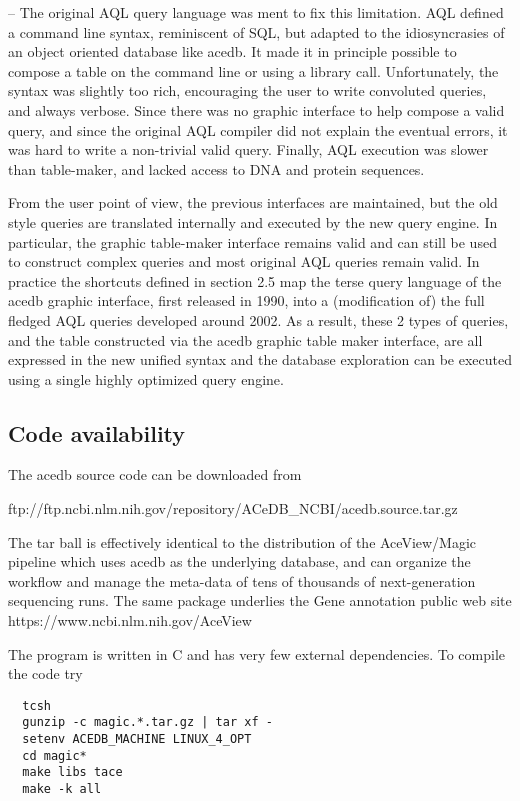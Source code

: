 \documentclass[11pt]{article}
\newcommand{\BL}{\begin{lstlisting}}
\begin{document}
-- The original AQL query language was ment to fix this limitation. AQL defined a command line syntax, reminiscent of SQL, but adapted to the idiosyncrasies of an object oriented database like acedb. It made it in principle possible to compose a table on the command line or using a library call. Unfortunately, the syntax was slightly too rich, encouraging the user to write convoluted queries, and always verbose. Since there was no graphic interface to help compose a valid query, and since the original AQL compiler did not explain the eventual errors, it was hard to write a non-trivial valid query. Finally, AQL execution was slower than table-maker, and lacked access to DNA and protein sequences. 

From the user point of view, the previous interfaces are maintained, but the old style queries are translated internally and executed by the new query engine. In particular, the graphic table-maker interface remains valid and can still be used to construct complex queries and most original AQL queries remain valid. In practice the shortcuts 
defined in section 2.5 map the terse query language of the acedb graphic interface, first released in 1990, into a (modification of) the full fledged 
AQL queries developed around 2002. As a result, these 2 types of queries, and the table constructed via the acedb graphic table 
maker interface, are all expressed in the new unified syntax and the database exploration can be executed using a single highly optimized query engine.


%%%%%%%%%%%%%%%%%%%%%%%%%%%%%%%%%%%%%%%%%%%%%%%%%%%%%%%%%%%%%%%%
% SECTION
%%%%%%%%%%%%%%%%%%%%%%%%%%%%%%%%%%%%%%%%%%%%%%%%%%%%%%%%%%%%%%%%
\subsection {Code availability}

The acedb source code can be downloaded from 
 
ftp://ftp.ncbi.nlm.nih.gov/repository/ACeDB\_NCBI/acedb.source.tar.gz

The tar ball is effectively identical to the distribution of the AceView/Magic pipeline 
\cite{[4]} which uses acedb as the underlying database, and can organize the workflow and manage the
meta-data of tens of thousands of next-generation sequencing runs. The same package
underlies the Gene annotation public web site https://www.ncbi.nlm.nih.gov/AceView \cite{[3]}

The program is written in C and has very few external dependencies. To compile the code try
\BL
  tcsh 
  gunzip -c magic.*.tar.gz | tar xf -
  setenv ACEDB_MACHINE LINUX_4_OPT
  cd magic*
  make libs tace
  make -k all
\end{lstlisting}
 
\end{document}
